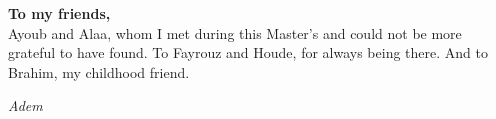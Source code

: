 \vspace{0.5cm}

\noindent\textbf{To my friends,}\\
Ayoub and Alaa, whom I met during this Master's and could not be more grateful
to have found. To Fayrouz and Houde, for always being there. And to Brahim,
my childhood friend.


\vspace{1.5cm}
\begin{flushright}
\textit{Adem}
\end{flushright}

\newpage
